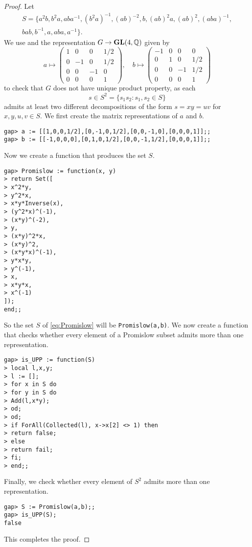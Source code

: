 \begin{proof}
    Let 
    \begin{multline}
    \label{eq:Promislow}
    S=\{ a^2b,
    b^2a,
    aba^{-1},
    (b^2a)^{-1},
    (ab)^{-2},
    b,
    (ab)^2a,
    (ab)^2,
    (aba)^{-1},\\
    bab,
    b^{-1},
    a,
    aba,
    a^{-1}
    \}.
    \end{multline}
    We use \cite{GAP4} and the representation $G\to\mathbf{GL}(4,\mathbb{Q})$ given by 
    \[
a\mapsto\begin{pmatrix}
1 & 0 & 0 & 1/2\\
0 & -1 & 0 & 1/2\\
0 & 0 & -1 & 0\\
0 & 0 & 0 & 1
\end{pmatrix},
\quad
b\mapsto\begin{pmatrix}
-1 & 0 & 0 & 0\\
0 & 1 & 0 & 1/2\\
0 & 0 & -1 & 1/2\\
0 & 0 & 0 & 1
\end{pmatrix}
\]
    to check that 
    $G$ does not have
    unique product property, as each 
    \[
    s\in S^2=\{s_1s_2:s_1,s_2\in S\}
    \]
    admits at least two different decompositions of the 
    form $s=xy=uv$ for $x,y,u,v\in S$. 
    We first create the matrix representations of $a$ and $b$.
\begin{lstlisting}
gap> a := [[1,0,0,1/2],[0,-1,0,1/2],[0,0,-1,0],[0,0,0,1]];;
gap> b := [[-1,0,0,0],[0,1,0,1/2],[0,0,-1,1/2],[0,0,0,1]];;
\end{lstlisting}
    Now we create
    a function that produces the set $S$.
\begin{lstlisting}
gap> Promislow := function(x, y)
> return Set([
> x^2*y,
> y^2*x,
> x*y*Inverse(x),
> (y^2*x)^(-1),
> (x*y)^(-2),
> y,
> (x*y)^2*x,
> (x*y)^2,
> (x*y*x)^(-1),
> y*x*y,
> y^(-1),
> x,
> x*y*x,
> x^(-1)
]);
end;;
\end{lstlisting}
So the set $S$ of \eqref{eq:Promislow} 
will be \lstinline{Promislow(a,b)}. We now
create a function that checks whether
every element of a Promislow subset 
admits more than one representation.
\begin{lstlisting}
gap> is_UPP := function(S)
> local l,x,y;
> l := [];
> for x in S do
> for y in S do
> Add(l,x*y);
> od;
> od;
> if ForAll(Collected(l), x->x[2] <> 1) then
> return false;
> else
> return fail;
> fi;
> end;;
\end{lstlisting}
Finally, we check whether every element of 
$S^2$ admits more than one representation.
\begin{lstlisting}
gap> S := Promislow(a,b);;
gap> is_UPP(S);
false
\end{lstlisting}
This completes the proof. 
\end{proof}

